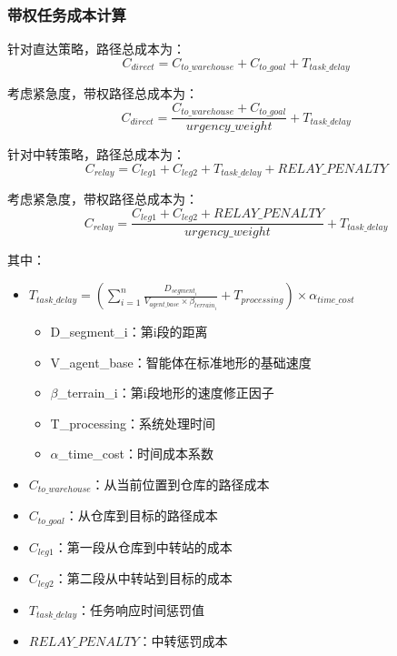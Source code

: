 \documentclass[12pt,a4paper]{article}
\begin{document}
\subsubsection{带权任务成本计算}
针对直达策略，路径总成本为：
\begin{equation}
C_{direct} = C_{to\_warehouse} + C_{to\_goal} + T_{task\_delay}
\end{equation}

考虑紧急度，带权路径总成本为：
\begin{equation}
C_{direct} = \frac{C_{to\_warehouse} + C_{to\_goal} }{urgency\_weight}+ T_{task\_delay}
\end{equation}


针对中转策略，路径总成本为：
\begin{equation}
C_{relay} = C_{leg1} + C_{leg2}+ T_{task\_delay} + {RELAY\_PENALTY} 
\end{equation}

考虑紧急度，带权路径总成本为：
\begin{equation}
C_{relay} = \frac{C_{leg1} + C_{leg2}+ {RELAY\_PENALTY}}{urgency\_weight} + T_{task\_delay}  
\end{equation}

其中：



\begin{itemize}
\item $T_{task\_delay} = \left(\sum_{i=1}^{n} \frac{D_{segment_i}}{V_{agent\_base} \times \beta_{terrain_i}} + T_{processing}\right) \times \alpha_{time\_cost}$
\begin{itemize}
 \item D\_{segment\_i}：第i段的距离
 \item V\_{agent\_base}：智能体在标准地形的基础速度
 \item $\beta$\_{terrain\_i}：第i段地形的速度修正因子
 \item T\_{processing}：系统处理时间
 \item $\alpha$\_{time\_cost}：时间成本系数

\end{itemize}
\item $C_{to\_warehouse}$：从当前位置到仓库的路径成本
\item $C_{to\_goal}$：从仓库到目标的路径成本
\item $C_{leg1}$：第一段从仓库到中转站的成本
\item $C_{leg2}$：第二段从中转站到目标的成本
\item $T_{task\_delay}$：任务响应时间惩罚值
\item $RELAY\_PENALTY$：中转惩罚成本

\end{itemize}
\end{document}
